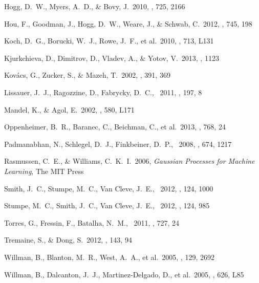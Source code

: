 \documentclass[letterpaper,12pt,preprint]{hack_aastex}
\begin{document}
\begin{thebibliography}{}
Hogg, D.~W., Myers, A.~D., \& Bovy, J.\ 2010, \apj, 725, 2166

Hou, F., Goodman, J., Hogg, D.~W., Weare, J., \& Schwab, C.\ 2012, \apj, 745, 198

Koch, D.~G., Borucki, W.~J., Rowe, J.~F., et al.\ 2010, \apjl,
713, L131

Kjurkchieva, D., Dimitrov, D., Vladev, A., \& Yotov, V.\ 2013, \mnras,
1123

Kov{\'a}cs, G., Zucker, S., \& Mazeh, T.\ 2002, \aap, 391, 369

Lissauer, J.~J., Ragozzine, D., Fabrycky, D.~C., \etal\ 2011, \apjs, 197, 8

Mandel, K., \& Agol, E.\ 2002, \apjl, 580, L171

Oppenheimer, B.~R., Baranec, C., Beichman, C., et al.\ 2013, \apj, 768, 24

Padmanabhan, N., Schlegel, D.~J., Finkbeiner, D.~P., \etal\ 2008, \apj, 674, 1217

Rasmussen, C.~E., \& Williams, C.~K.~I.\ 2006, \emph{Gaussian Processes for
Machine Learning}, The MIT Press

Smith, J.~C., Stumpe, M.~C., Van Cleve, J.~E., \etal\ 2012, \pasp, 124, 1000

Stumpe, M.~C., Smith, J.~C., Van Cleve, J.~E., \etal\ 2012, \pasp, 124, 985

Torres, G., Fressin, F., Batalha, N.~M., \etal\ 2011, \apj, 727, 24

Tremaine, S., \& Dong, S.\ 2012, \aj, 143, 94

Willman, B., Blanton, M.~R., West, A.~A., et al.\ 2005, \aj, 129, 2692

Willman, B., Dalcanton, J.~J., Martinez-Delgado, D., et al.\ 2005, \apjl, 626, L85
\end{thebibliography}
\end{document}
